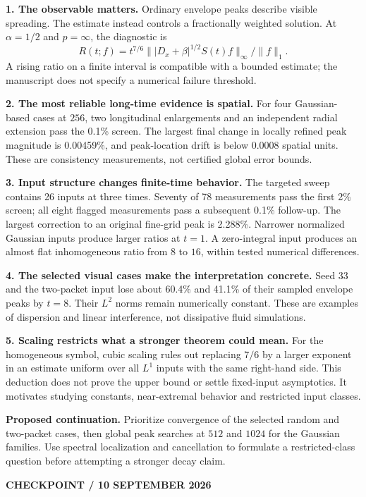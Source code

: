\documentclass[10pt,letterpaper]{article}
\newcommand{\eyebrow}[1]{{\color{teal}\normalsize\bfseries #1}\par}
\newcommand{\callout}[1]{\par\smallskip\colorbox{pale}{\parbox{.96\linewidth}{\vspace{5pt}#1\vspace{5pt}}}\par\smallskip}
\begin{document}
\textbf{1. The observable matters.} Ordinary envelope peaks describe visible
spreading. The estimate instead controls a fractionally weighted solution. At
$\alpha=1/2$ and $p=\infty$, the diagnostic is
\[
 R(t;f)=t^{7/6}\big\||D_x+\beta|^{1/2}S(t)f\big\|_\infty/\|f\|_1.
\]
A rising ratio on a finite interval is compatible with a bounded estimate; the
manuscript does not specify a numerical failure threshold.

\textbf{2. The most reliable long-time evidence is spatial.} For four
Gaussian-based cases at $256$, two longitudinal enlargements and an independent
radial extension pass the 0.1\% screen. The largest final change in locally
refined peak magnitude is 0.00459\%, and peak-location drift is below 0.0008
spatial units. These are consistency measurements, not certified global error bounds.

\textbf{3. Input structure changes finite-time behavior.} The targeted sweep
contains 26 inputs at three times. Seventy of 78 measurements pass the first 2\%
screen; all eight flagged measurements pass a subsequent 0.1\% follow-up. The
largest correction to an original fine-grid peak is 2.288\%. Narrower normalized
Gaussian inputs produce larger ratios at $t=1$. A zero-integral input produces an
almost flat inhomogeneous ratio from $8$ to $16$, within tested numerical differences.

\textbf{4. The selected visual cases make the interpretation concrete.} Seed 33
and the two-packet input lose about 60.4\% and 41.1\% of their sampled envelope
peaks by $t=8$. Their $L^2$ norms remain numerically constant. These are examples
of dispersion and linear interference, not dissipative fluid simulations.

\textbf{5. Scaling restricts what a stronger theorem could mean.} For the
homogeneous symbol, cubic scaling rules out replacing $7/6$ by a larger exponent
in an estimate uniform over all $L^1$ inputs with the same right-hand side.
This deduction does not prove the upper bound or settle fixed-input asymptotics.
It motivates studying constants, near-extremal behavior and restricted input classes.
\callout{\textbf{Proposed continuation.} Prioritize convergence of
the selected random and two-packet cases, then global peak searches at $512$ and
$1024$ for the Gaussian families. Use spectral localization and cancellation to
formulate a restricted-class question before attempting a stronger decay claim.}

\newpage
{}\label{checkpoint}
\eyebrow{CHECKPOINT / 10 SEPTEMBER 2026}
\end{document}

